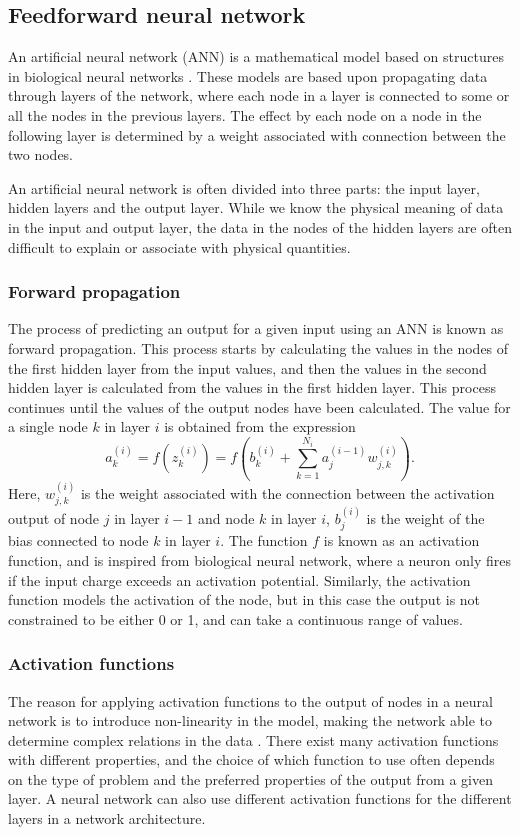 \documentclass[12pt]{article}
\begin{document}
\subsection{Feedforward neural network}
An artificial neural network (ANN) is a mathematical model based on structures in biological neural networks \cite{Goodfellow-et-al-2016}. These models are based upon propagating data through layers of the network, where each node in a layer is connected to some or all the nodes in the previous layers. The effect by each node on a node in the following layer is determined by a weight associated with connection between the two nodes.

An artificial neural network is often divided into three parts: the input layer, hidden layers and the output layer. While we know the physical meaning of data in the input and output layer, the data in the nodes of the hidden layers are often difficult to explain or associate with physical quantities.

\subsubsection{Forward propagation}
The process of predicting an output for a given input using an ANN is known as forward propagation. This process starts by calculating the values in the nodes of the first hidden layer from the input values, and then the values in the second hidden layer is calculated from the values in the first hidden layer. This process continues until the values of the output nodes have been calculated. The value for a single node $k$ in layer $i$ is obtained from the expression
\begin{equation}\label{eq:FF_activation}
    a^{(i)}_k = f \left( z^{(i)}_k \right)= f\left(  b^{(i)}_k + \sum_{k=1}^{N_i} a^{(i-1)}_j w^{(i)}_{j, k} \right).
\end{equation}
Here, $w^{(i)}_{j, k}$ is the weight associated with the connection between the activation output of node $j$ in layer $i-1$ and node $k$ in layer $i$, $b^{(i)}_j$ is the weight of the bias connected to node $k$ in layer $i$.
The function $f$ is known as an activation function, and is inspired from biological neural network, where a neuron only fires if the input charge exceeds an activation potential. Similarly, the activation function models the activation of the node, but in this case the output is not constrained to be either \num{0} or \num{1}, and can take a continuous range of values. 

\subsubsection{Activation functions}
The reason for applying activation functions to the output of nodes in a neural network is to introduce non-linearity in the model, making the network able to determine complex relations in the data \cite{Sharma-2020}. 
There exist many activation functions with different properties, and the choice of which function to use often depends on the type of problem and the preferred properties of the output from a given layer. A neural network can also use different activation functions for the different layers in a network architecture.
\end{document}
